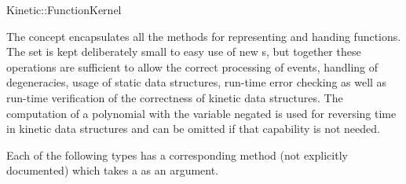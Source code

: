 

\begin{ccRefConcept}{Kinetic::FunctionKernel}


\ccDefinition
  
The concept \ccRefName{} encapsulates all the methods for representing
and handing functions. The set is kept deliberately small to easy use
of new \ccRefName{}s, but together these operations are sufficient to
allow the correct processing of events, handling of degeneracies,
usage of static data structures, run-time error checking as well as
run-time verification of the correctness of kinetic data structures.
The computation of a polynomial with the variable negated is used for
reversing time in kinetic data structures and can be omitted if that
capability is not needed.


\ccTypes






Each of the following types has a corresponding 
method (not explicitly documented) which takes a  as an
argument.



\end{ccRefConcept}
